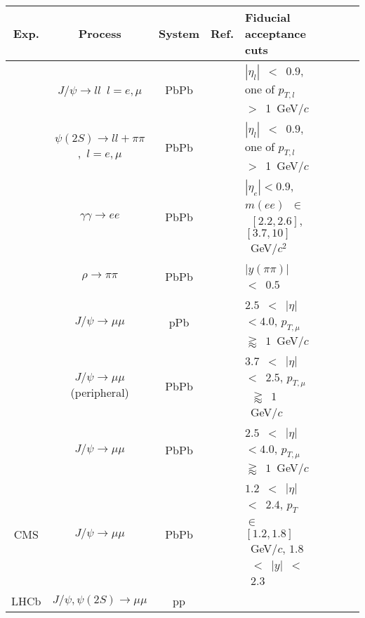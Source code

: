 \documentclass[../report.tex]{subfiles}
\begin{document}
\begin{table}[htbp]
  {\small
    \centering
    \begin{tabular}{|c|c|c|c|l|c|c|c|c|}
      \hline
      Exp. & Process & System & Ref. & Fiducial acceptance cuts \\
      \hline
          {\multirow{7}{*}{ALICE}} &
          $J/\psi \to ll$~$l=e,\mu$ &
          PbPb &
          \cite{Abbas:2013oua} &
          $|\eta_l|$~$<$~$0.9$,
          one of $p_{T,l}$~$>$~1~GeV/$c$
          \\
          &
          $\psi(2S)\to ll+\pi\pi$,~$l=e,\mu$ & %
          PbPb     &
          \cite{Adam:2015sia} &
          $|\eta_l|$~$<$~$0.9$,
          one of $p_{T,l}$~$>$~1~GeV/$c$
          \\
          &
          $\gamma\gamma\to ee$        &
          PbPb     &
          \cite{Abbas:2013oua}   &
          $|\eta_e|<0.9$,
          $m(ee)$~$\in$~$[2.2,2.6]$,~$[3.7,10]$~GeV/$c^2$
          \\
          &
          $\rho \to \pi\pi$           &
          PbPb     &
          \cite{Adam:2015gsa} &
          $|y(\pi\pi)|$~$<$~$0.5$
          \\
          &
          $J/\psi \to \mu\mu$         &
          pPb      &
          \cite{TheALICE:2014dwa}  &
          $2.5$~$<$~$|\eta|$~$<4.0$,
          $p_{T,\mu}$~$\gtrapprox$~$1$~GeV/$c$
          \\
          &
          $J/\psi \to \mu\mu$ (peripheral)        &
          PbPb     &
          \cite{Abelev:2012ba}  &
          $3.7$~$<$~$|\eta|$~$<$~$2.5$,
          $p_{T,\mu}$~$\gtrapprox$~$1$~GeV/$c$
          \\
          &
          $J/\psi \to \mu\mu$         &
          PbPb&
          \cite{Adam:2015gba} &
          $2.5$~$<$~$|\eta|$~$<4.0$,
          $p_{T,\mu}$~$\gtrapprox$~$1$~GeV/$c$
          \\
          \hline
          CMS          &
          $J/\psi \to \mu\mu$         &
          PbPb     &
          \cite{Khachatryan:2016qhq}                  &
          $1.2$~$<$~$|\eta|$~$<$~$2.4$,
          $p_{T}$~$\in$~$[1.2,1.8]$~GeV/$c$,
          $1.8$~$<$~$|y|$~$<$~$2.3$
          \\
          \hline
          LHCb         &
          $J/\psi,\psi(2S) \to \mu\mu$&
          pp       &
          \cite{Aaij:2014iea}

\end{tabular}}
\end{table}
\end{document}
